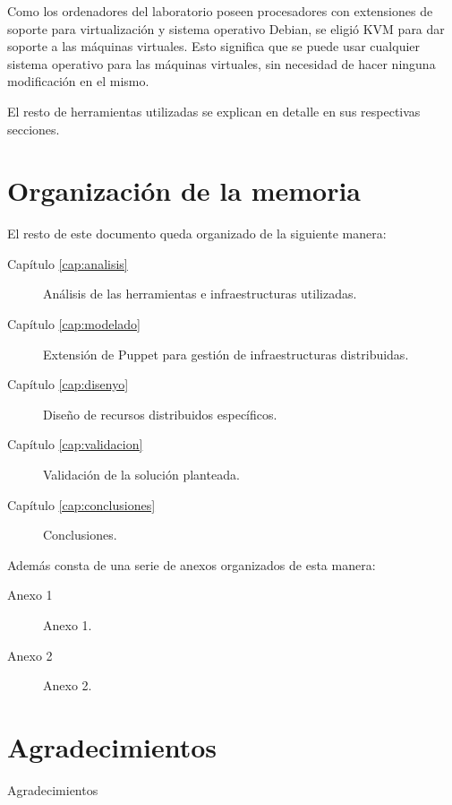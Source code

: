 Como los ordenadores del laboratorio poseen procesadores con extensiones de soporte para virtualización y sistema operativo Debian, se eligió KVM para dar soporte a las máquinas virtuales. Esto significa que se puede usar cualquier sistema operativo para las máquinas virtuales, sin necesidad de hacer ninguna modificación en el mismo.

El resto de herramientas utilizadas se explican en detalle en sus respectivas secciones.


\section{Organización de la memoria}

El resto de este documento queda organizado de la siguiente manera:
\begin{description}
\item[Capítulo \ref{cap:analisis}] Análisis de las herramientas e infraestructuras utilizadas.
\item[Capítulo \ref{cap:modelado}] Extensión de Puppet para gestión de infraestructuras distribuidas.
\item[Capítulo \ref{cap:disenyo}] Diseño de recursos distribuidos específicos.
\item[Capítulo \ref{cap:validacion}] Validación de la solución planteada.
\item[Capítulo \ref{cap:conclusiones}] Conclusiones.
\end{description}

Además consta de una serie de anexos organizados de esta manera:
\begin{description}
\item[Anexo 1] Anexo 1.
\item[Anexo 2] Anexo 2.
\end{description}


\section{Agradecimientos}

Agradecimientos
